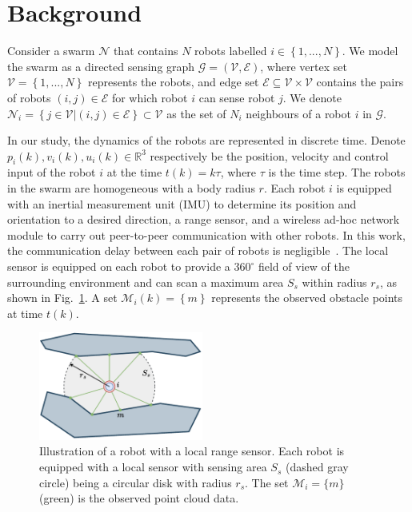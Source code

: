 \section{Background}\label{sec:problem}
Consider a swarm $\mathcal{N}$ that contains $N$ robots labelled $i\in\left\{1,...,N\right\}$. We model the swarm as a directed sensing graph $\mathcal{G}=\left(\mathcal{V},\mathcal{E}\right)$, where vertex set $\mathcal{V} = \left\{1,..., N\right\}$ represents the robots, and edge set $\mathcal{E}\subseteq\mathcal{V}\times \mathcal{V}$ contains the pairs of robots $\left(i, j\right)\in\mathcal{E}$ for which robot $i$ can sense robot $j$. We denote $\mathcal{N}_i=\left\{j\in\mathcal{V}|\left(i,j\right)\in\mathcal{E}\right\}\subset\mathcal{V}$ as the set of $N_i$ neighbours of a robot $i$ in $\mathcal{G}$.

In our study, the dynamics of the robots are represented in discrete time. Denote $p_i(k),v_i(k),u_i(k)\in\mathbb{R}^3$ respectively be the position, velocity and control input of the robot $i$ at the time $t(k) = k\tau$, where $\tau$ is the time step. The robots in the swarm are homogeneous with a body radius $r$. Each robot $i$ is equipped with an inertial measurement unit (IMU) to determine its position and orientation to a desired direction, a range sensor, and a wireless ad-hoc network module to carry out peer-to-peer communication with other robots. In this work, the communication delay between each pair of robots is negligible~\cite{AlonsoMora2018,9527169}. The local sensor is equipped on each robot to provide a $360^\circ$ field of view of the surrounding environment and can scan a maximum area $S_s$ within radius $r_s$, as shown in Fig.~\ref{fig:model}. A set $\mathcal{M}_i(k)=\left\{m\right\}$ represents the observed obstacle points at time $t(k)$.
\begin{figure}
    \centering
    \includegraphics[width=0.48\textwidth]{paper3/images/model.pdf}
    \caption{Illustration of a robot with a local range sensor. Each robot is equipped with a local sensor with sensing area $S_s$ (dashed gray circle) being a circular disk with radius $r_s$. The set $\mathcal{M}_i=\{m\}$ (green) is the observed point cloud data.}
    \label{fig:model}
\end{figure}

